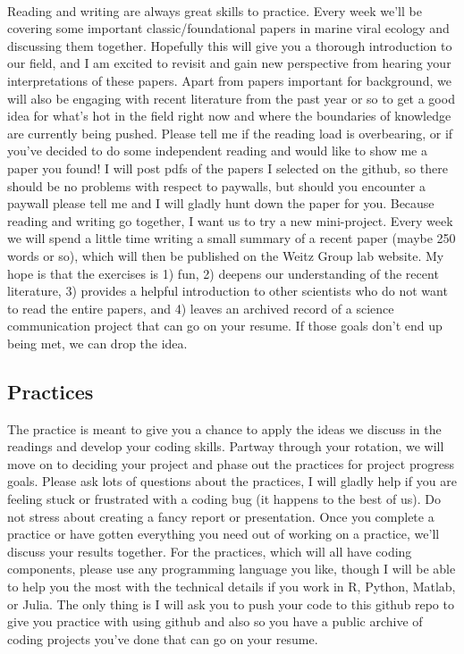 \documentclass[11pt]{amsart}
\begin{document}
\paragraph{} Reading and writing are always great skills to practice. Every week we'll be covering some important classic/foundational papers in marine viral ecology and discussing them together. Hopefully this will give you a thorough introduction to our field, and I am excited to revisit and gain new perspective from hearing your interpretations of these papers. Apart from papers important for background, we will also be engaging with recent literature from the past year or so to get a good idea for what's hot in the field right now and where the boundaries of knowledge are currently being pushed. Please tell me if the reading load is overbearing, or if you've decided to do some independent reading and would like to show me a paper you found! I will post pdfs of the papers I selected on the github, so there should be no problems with respect to paywalls, but should you encounter a paywall please tell me and I will gladly hunt down the paper for you. Because reading and writing go together, I want us to try a new mini-project. Every week we will spend a little time writing a small summary of a recent paper (maybe 250 words or so), which will then be published on the Weitz Group lab website. My hope is that the exercises is 1) fun, 2) deepens our understanding of the recent literature, 3) provides a helpful introduction to other scientists who do not want to read the entire papers, and 4) leaves an archived record of a science communication project that can go on your resume. If those goals don't end up being met, we can drop the idea. 
\subsection{Practices} The practice is meant to give you a chance to apply the ideas we discuss in the readings and develop your coding skills. Partway through your rotation, we will move on to deciding your project and phase out the practices for project progress goals. Please ask lots of questions about the practices, I will gladly help if you are feeling stuck or frustrated with a coding bug (it happens to the best of us). Do not stress about creating a fancy report or presentation. Once you complete a practice or have gotten everything you need out of working on a practice, we'll discuss your results together. For the practices, which will all have coding components, please use any programming language you like, though I will be able to help you the most with the technical details if you work in R, Python, Matlab, or Julia. The only thing is I will ask you to push your code to this github repo to give you practice with using github and also so you have a public archive of coding projects you've done that can go on your resume. 
\end{document}
